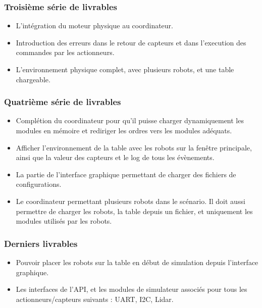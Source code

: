     \subsubsection{Troisième série de livrables}
    \begin{itemize}
        
        \item{L'intégration du moteur physique au coordinateur.}
        
        \item{Introduction des erreurs dans le retour de capteurs et dans l'execution des commandes par les actionneurs.}
        
        \item{L'environnement physique complet, avec plusieurs robots, et une table chargeable.}
        
    \end{itemize}
    \subsubsection{Quatrième série de livrables}
    \begin{itemize}
        
        \item{Complétion du coordinateur pour qu'il puisse charger dynamiquement les modules en mémoire et rediriger les ordres vers les modules adéquats.}
        
        \item{Afficher l'environnement de la table avec les robots sur la fenêtre principale, ainsi que la valeur des capteurs et le log de tous les évènements.}
        
        \item{La partie de l'interface graphique permettant de charger des fichiers de configurations.}
        
        \item{Le coordinateur permettant plusieurs robots dans le scénario. Il doit aussi permettre de charger les robots, la table depuis un fichier, et uniquement les modules utilisés par les robots.}
        
    \end{itemize}
    \subsubsection{Derniers livrables}
    \begin{itemize}
        
        \item{Pouvoir placer les robots sur la table en début de simulation depuis l'interface graphique.}
        
        \item{Les interfaces de l'API, et les modules de simulateur associés pour tous les actionneurs/capteurs suivants : UART, I2C, Lidar.}
        
    \end{itemize}
